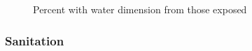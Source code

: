 \documentclass[
  letterpaper,
  DIV=11,
  numbers=noendperiod]{scrartcl}
\begin{document}
\begin{figure}[H]


\caption{\label{fig-water}Percent with water dimension from those
exposed}

\end{figure}%

\subsubsection{Sanitation}\label{sanitation}
\end{document}
